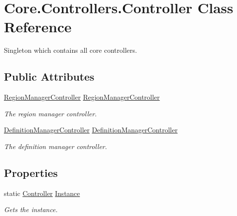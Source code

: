 \hypertarget{classCore_1_1Controllers_1_1Controller}{}\section{Core.\+Controllers.\+Controller Class Reference}
\label{classCore_1_1Controllers_1_1Controller}


Singleton which contains all core controllers.  


\subsection*{Public Attributes}
\begin{DoxyCompactItemize}
\item 
\hyperlink{classCore_1_1Controllers_1_1RegionManagerController}{Region\+Manager\+Controller} \hyperlink{classCore_1_1Controllers_1_1Controller_a13c0a9251d550621898cffbfcfc732a7}{Region\+Manager\+Controller}
\begin{DoxyCompactList}\small\item\em The region manager controller. \end{DoxyCompactList}\item 
\hyperlink{classCore_1_1Controllers_1_1DefinitionManagerController}{Definition\+Manager\+Controller} \hyperlink{classCore_1_1Controllers_1_1Controller_a607c9eb803a7f9ec2e60b96827ef26ae}{Definition\+Manager\+Controller}
\begin{DoxyCompactList}\small\item\em The definition manager controller. \end{DoxyCompactList}\end{DoxyCompactItemize}
\subsection*{Properties}
\begin{DoxyCompactItemize}
\item 
static \hyperlink{classCore_1_1Controllers_1_1Controller}{Controller} \hyperlink{classCore_1_1Controllers_1_1Controller_a083108465e3ad1fc6ccdd7f0c20ef5cb}{Instance}
\begin{DoxyCompactList}\small\item\em Gets the instance. \end{DoxyCompactList}\end{DoxyCompactItemize}


